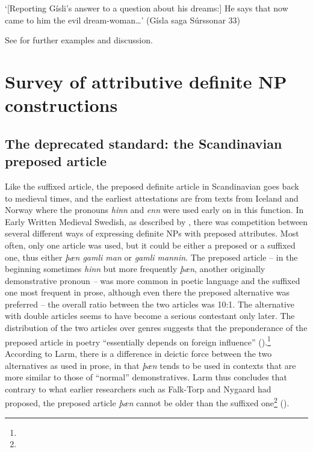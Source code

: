 \begin{styleTranslation}
‘[Reporting Gísli’s answer to a question about his dreams:] He says that now came to him the evil dream-woman…’ (Gísla saga Súrssonar 33)

\end{styleTranslation}

 See \citet{Dahl2003} for further examples and discussion.

\section{\rmfamily\bfseries Survey of attributive definite NP constructions}
\label{bkm:Ref224464037}\subsection{\rmfamily The deprecated standard: the Scandinavian preposed article}
\label{bkm:Ref154988501}\label{bkm:Ref154983973}
\begin{styleBodyTextFirst}
Like the suffixed article, the preposed definite article in Scandinavian goes back to medieval times, and the earliest attestations are from texts from Iceland and Norway where the pronouns \textit{hinn }and\textit{ enn} were used early on in this function. In Early Written Medieval Swedish, as described by \citet{Larm1936}, there was competition between several different ways of expressing definite NPs with preposed attributes. Most often, only one article was used, but it could be either a preposed or a suffixed one, thus either \textit{þæn gamli man} or \textit{gamli mannin}. The preposed article – in the beginning sometimes \textit{hinn} but more frequently \textit{þæn}, another originally demonstrative pronoun \textit{ – }was more common in poetic language and the suffixed one most frequent in prose, although even there the preposed alternative was preferred – the overall ratio between the two articles was 10:1. The alternative with double articles seems to have become a serious contestant only later. The distribution of the two articles over genres suggests that the preponderance of the preposed article in poetry “essentially depends on foreign influence” (\citet[68]{Larm1936}).\footnote{} According to Larm, there is a difference in deictic force between the two alternatives as used in prose, in that \textit{þæn} tends to be used in contexts that are more similar to those of “normal” demonstratives. Larm thus concludes that contrary to what earlier researchers such as Falk-Torp and Nygaard had proposed, the preposed article \textit{þæn} cannot be older than the suffixed one\footnote{} (\citet[64]{Larm1936}).

\end{styleBodyTextFirst}

